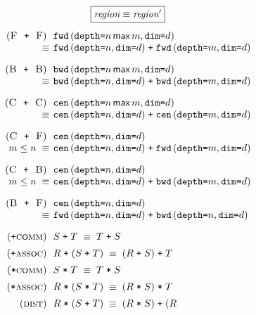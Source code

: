 \documentclass[9pt]{sigplanconf}
\theoremstyle{definition}
\newcommand{\term}[1]{\texttt{#1}}
\newcommand{\stenFwdS}[2]{\term{fwd} \, (\term{depth=}#1,
  \term{dim=}#2)}
\newcommand{\stenBwdS}[2]{\term{bwd} \, (\term{depth=}#1,
  \term{dim=}#2)}
\newcommand{\stenCenS}[2]{\term{cen} \, (\term{depth=}#1,
  \term{dim=}#2)}
\begin{document}
\begin{figure}
\begin{align*}
\setlength{\arraycolsep}{0.05em}
\begin{array}{c}
\framebox{$\textit{region} \equiv \textit{region}'$} \\[1em]
\begin{array}{rll}
(\textsc{F\; \texttt{+} \;F}) \;\; &
\stenFwdS{n \, \textsf{max} \, m}{d} \\
 \equiv \; & \stenFwdS{n}{d} \; \texttt{+} \; \stenFwdS{m}{d} \\[1em]
%
(\textsc{B\; \texttt{+} \;B}) \;\; &
\stenBwdS{n \, \textsf{max} \, m}{d} \\
 \equiv \; & \stenBwdS{n}{d} \; \texttt{+} \; \stenBwdS{m}{d} \\[1em]
%
(\textsc{C\; \texttt{+} \;C}) \;\; &
\stenCenS{n \, \textsf{max} \, m}{d} \\
\equiv \; & \stenCenS{n}{d} \; \texttt{+} \; \stenCenS{m}{d} \\[1em]
%
(\textsc{C\; \texttt{+} \;F}) \;\; & \stenCenS{n}{d} \\
\textit{$m \leq n$} \; \equiv \; & \stenCenS{n}{d} \; \texttt{+} \;
                      \stenFwdS{m}{d} \\[1em]
%
(\textsc{C\; \texttt{+} \;B}) \;\; &
\stenCenS{n}{d} \\
\textit{$m \leq n$} \; \equiv \; & \stenCenS{n}{d} \; \texttt{+} \;
                      \stenBwdS{m}{d} \\[1em]
(\textsc{B\; \texttt{+} \;F}) \;\; &
\stenCenS{n}{d} \\
\equiv \; & \stenFwdS{n}{d} \; \texttt{+} \; \stenBwdS{n}{d} \\[1em]
%
(\texttt{+}\textsc{comm}) \;\; & S \; \texttt{+} \; T \; \equiv \; T \;
                       \texttt{+} \; S \\[0.5em]
%
(\texttt{+}\textsc{assoc}) \;\; & R \; \texttt{+} \; (S \; \texttt{+} \; T) \; \equiv \; (R \;
                       \texttt{+} \; S) \; \texttt{+} \; T \\[0.5em]
(\texttt{*}\textsc{comm}) \;\; & S \; \texttt{*} \; T \; \equiv \; T \;
                       \texttt{*} \; S \\[0.5em]
%
(\texttt{*}\textsc{assoc}) \;\; & R \; \texttt{*} \; (S \; \texttt{*} \; T) \; \equiv \; (R \;
                       \texttt{*} \; S) \; \texttt{*} \; T \\[0.5em]
(\textsc{dist}) \;\; & R \; \texttt{*} \; (S \; \texttt{+} \; T) \; \equiv \; (R \;
                       \texttt{*} \; S) \; \texttt{+} \; (R

\end{array}
\end{array}
\end{align*}
\end{figure}
\end{document}
